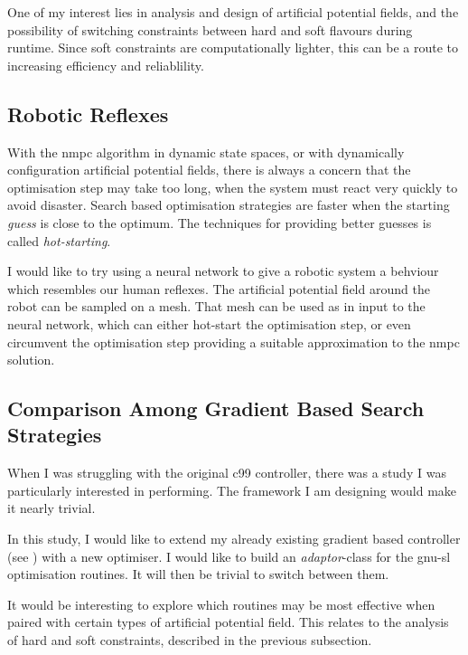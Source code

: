 One of my interest lies in analysis and design of artificial potential fields,
and the possibility of switching constraints between hard and soft flavours
during runtime. Since soft constraints are computationally lighter, this can be
a route to increasing efficiency and reliablility.


\subsection{Robotic Reflexes}

With the \ac{nmpc} algorithm in dynamic state spaces, or with dynamically
configuration artificial potential fields, there is always a concern that the
optimisation step may take too long, when the system must react very quickly to
avoid disaster. Search based optimisation strategies are faster when the
starting \emph{guess} is close to the optimum. The techniques for providing
better guesses is called \emph{hot-starting}.

I would like to try using a neural network to give a robotic system a behviour
which resembles our human reflexes. The artificial potential field around the
robot can be sampled on a mesh. That mesh can be used as in input to the neural
network, which can either hot-start the optimisation step, or even circumvent
the optimisation step providing a suitable approximation to the \ac{nmpc}
solution.


\subsection{Comparison Among Gradient Based Search Strategies}

When I was struggling with the original \ac{c99} controller, there was a study I
was particularly interested in performing. The framework I am designing would
make it nearly trivial.

In this study, I would like to extend my already existing gradient based
controller (see ) with a new optimiser. I would
like to build an \emph{adaptor}-class for the \ac{gnu-sl} optimisation routines. It
will then be trivial to switch between them.

It would be interesting to explore which routines may be most effective when
paired with certain types of artificial potential field. This relates to the
analysis of hard and soft constraints, described in the previous subsection.


